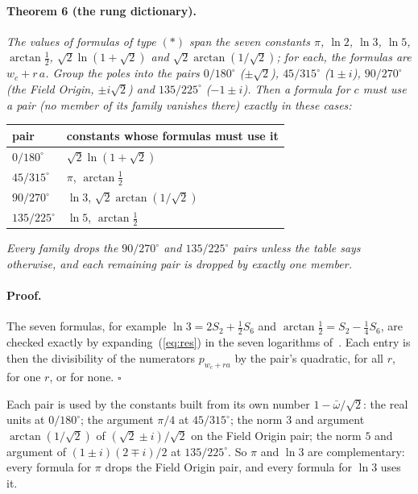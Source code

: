 \documentclass[twocolumn]{iopjournal}
\begin{document}
\paragraph{Theorem 6 (the rung dictionary).} \textit{The values of
formulas of type $(\ast)$ span the seven constants $\pi$, $\ln 2$,
$\ln 3$, $\ln 5$, $\arctan\frac12$, $\sqrt2\ln(1+\sqrt2)$ and
$\sqrt2\arctan(1/\sqrt2)$; for each, the formulas are $w_c + r\,a$.
Group the poles into the pairs $0/180^\circ$ ($\pm\sqrt2$),
$45/315^\circ$ ($1 \pm i$), $90/270^\circ$ (the Field Origin,
$\pm i\sqrt2$) and $135/225^\circ$ ($-1 \pm i$). Then a formula for
$c$ must use a pair (no member of its family vanishes there) exactly
in these cases:}
\begin{center}
\begin{tabular}{ll}
pair & constants whose formulas must use it\\
\hline
$0/180^\circ$ & $\sqrt2\ln(1+\sqrt2)$\\
$45/315^\circ$ & $\pi$, $\arctan\frac12$\\
$90/270^\circ$ & $\ln 3$, $\sqrt2\arctan(1/\sqrt2)$\\
$135/225^\circ$ & $\ln 5$, $\arctan\frac12$
\end{tabular}
\end{center}
\textit{Every family drops the $90/270^\circ$ and $135/225^\circ$ pairs
unless the table says otherwise, and each remaining pair is dropped by
exactly one member.}

\paragraph{Proof.} The seven formulas, for example
$\ln 3 = 2S_2 + \tfrac12 S_6$ and $\arctan\frac12 = S_2 - \tfrac14 S_6$,
are checked exactly by expanding~(\ref{eq:res}) in the seven
logarithms of~\cite{Nelson2026bbp}. Each entry is then the
divisibility of the numerators $p_{w_c + ra}$ by the pair's quadratic,
for all $r$, for one $r$, or for none. \hfill $\square$

\medskip
\noindent
Each pair is used by the constants built from its own number
$1 - \bar\omega/\sqrt2$: the real units at $0/180^\circ$; the argument
$\pi/4$ at $45/315^\circ$; the norm $3$ and argument
$\arctan(1/\sqrt2)$ of $(\sqrt2 \pm i)/\sqrt2$ on the Field Origin
pair; the norm $5$ and argument of $(1 \pm i)(2 \mp i)/2$ at
$135/225^\circ$. So $\pi$ and $\ln 3$ are complementary: every formula
for $\pi$ drops the Field Origin pair, and every formula for $\ln 3$
uses it.
\end{document}
